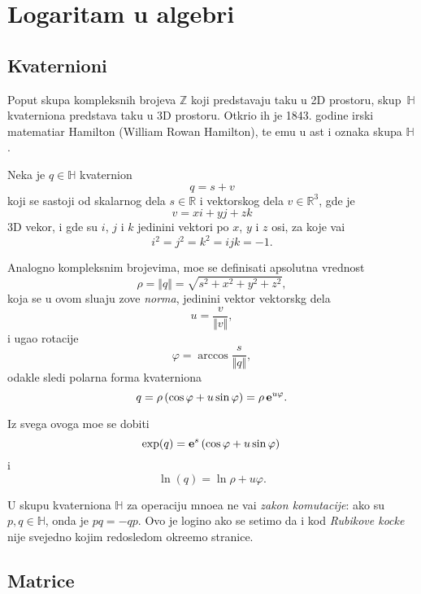 

\section{Logaritam u algebri}

\subsection{Kvaternioni}

\def\uv{{u}}
\def\vp{{\vec v}}
\def\norm#1{{\Vert#1\Vert}}

Poput skupa kompleksnih brojeva ${\mathbb Z}$ koji predstav{\lj}aju ta{\cv}ku u 2D prostoru,
skup~${\mathbb H}$ kvaterniona predstav{\lj}a ta{\cv}ku u 3D prostoru. Otkrio ih je 
1843. godine irski matemati{\cv}ar
Hamilton (William Rowan Hamilton), te {\nj}emu u {\cv}ast i oznaka skupa ${\mathbb H}$.

\medskip

Neka je $q\in{\mathbb H}$ kvaternion
$$
q=s+v
$$
koji se sastoji od skalarnog dela $s\in{\mathbb R}$ i vektorskog dela $v\in{\mathbb R}^3$, gde je
$$
v=xi+yj+zk
$$
3D vekor, i gde su $i$, $j$ i $k$ jedini{\cv}ni vektori po $x$, $y$ i $z$ osi,
za koje va{\zv}i
$$
i^2=j^2=k^2=ijk=-1.
$$

Analogno kompleksnim brojevima, mo{\zv}e se definisati apsolutna vrednost
$$
\rho = \norm q = \sqrt{s^2+x^2+y^2+z^2},
$$
koja se u ovom slu{\cv}aju zove {\sl norma},
jedini{\cv}ni vektor vektorskg dela
$$
\uv = \frac v{\norm v},
$$
i ugao rotacije
$$
\varphi = \arccos \frac s{\norm q},
$$
odakle sledi polarna forma kvaterniona
$$
q
=\rho\,(\cos\varphi + \uv\sin\varphi)
=\rho\,\e^{\uv\varphi}.
$$


Iz svega ovoga mo{\zv}e se dobiti
\begin{equation}
    \exp(q) = \e^s \left( \cos\varphi + \uv\sin\varphi \right)\\
\end{equation}
i
\begin{equation}
    \ln(q)  = \ln\rho + \uv\varphi.
\end{equation}


\bigskip

\danger U skupu kvaterniona ${\mathbb H}$ za operaciju mno{\zv}e{\nj}a ne va{\zv}i {\sl zakon komutacije}: ako su
$p,q\in{\mathbb H}$, onda je $pq=-qp$. Ovo je logi{\cv}no ako se setimo da i kod
{\sl Rubikove kocke\/} nije svejedno kojim redosledom okre{\cc}emo stranice.

\newpage

\subsection{Matrice}

\newpage
